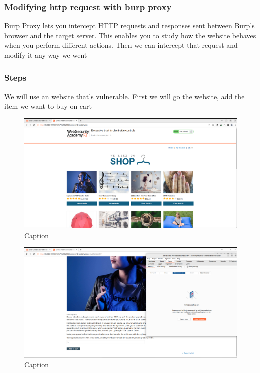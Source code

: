 \documentclass[
	a4paper, %
	12pt, %
]{CSSullivanBusinessReport}
\begin{document}
\subsubsection*{Modifying http request with burp proxy}

\begin{fullwidth}
    Burp Proxy lets you intercept HTTP requests and responses sent between Burp's browser and the target server. This enables you to study how the website behaves when you perform different actions. Then we can intercept that request and modify it any way we went
\end{fullwidth}

\subsubsection*{Steps}
\begin{fullwidth}
    

We will use an website that's vulnerable. First we will go the website, add the item we want to buy on cart

\begin{figure}[H]
    \centering
    \includegraphics[width=1\textwidth]{Images/anikaScreensots/lab1.png}
    \caption{Caption}
    \label{fig:enter-label}
\end{figure}

\begin{figure}[H]
    \centering
    \includegraphics[width=1\textwidth]{Images/anikaScreensots/lab2.png}
    \caption{Caption}
    \label{fig:enter-label}
\end{figure}


\end{fullwidth}
\end{document}
